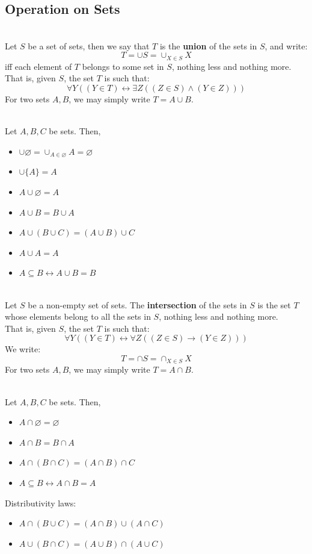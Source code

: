 \documentclass[12pt]{article}
\begin{document}
\subsection{Operation on Sets}
\begin{definition}[Union(6.4.1)]
\hfill\\
\normalfont Let $S$ be a set of sets, then we say that $T$ is the \textbf{union} of the sets in $S$, and write:
\[
T=\cup S = \cup_{X\in S}X
\]
iff each element of $T$ belongs to some set in $S$, nothing less and nothing more. \\
That is, given $S$, the set $T$ is such that:
\[
\forall Y((Y\in T)\leftrightarrow\exists Z((Z\in S)\land(Y\in Z)))
\]
For two sets $A,B$, we may simply write $T=A\cup B$.
\end{definition}
\begin{proposition}[6.4.2]
\hfill\\
\normalfont Let $A,B,C$ be sets. Then,
\begin{itemize}
\item $\cup\varnothing=\cup_{A\in\varnothing}A =\varnothing$
\item $\cup\{A\}=A$
\item $A\cup\varnothing = A$
\item $A\cup B = B\cup A$
\item $A\cup(B\cup C)=(A\cup B)\cup C$
\item $A\cup A=A$
\item $A\subseteq B\leftrightarrow A\cup B=B$
\end{itemize}
\end{proposition}
\begin{definition}[Intersection(6.4.3)]
\hfill\\
\normalfont Let $S$ be a non-empty set of sets. The \textbf{intersection} of the sets in $S$ is the
set $T$ whose elements belong to all the sets in $S$, nothing less and nothing more.\\
That is, given $S$, the set $T$ is such that:
\[
\forall Y((Y\in T)\leftrightarrow \forall Z((Z\in S)\rightarrow(Y\in Z)))
\]
We write:
\[
T=\cap S=\cap_{X\in S}X
\]
For two sets $A,B$, we may simply write $T=A\cap B$.
\end{definition}
\begin{proposition}[6.4.4]
\hfill\\
\normalfont
Let $A,B,C$ be sets. Then,
\begin{itemize}
\item $A\cap\varnothing=\varnothing$
\item $A\cap B = B\cap A$
\item $A\cap(B\cap C)=(A\cap B)\cap C$
\item $A\subseteq B\leftrightarrow A\cap B = A$
\end{itemize}
Distributivity laws:
\begin{itemize}
\item $A\cap(B\cup C)=(A\cap B)\cup(A\cap C)$
\item $A\cup(B\cap C)=(A\cup B)\cap(A\cup C)$
\end{itemize}
\end{proposition}
\end{document}

